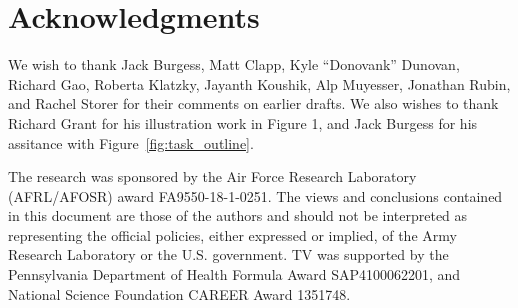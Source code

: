 \section*{Acknowledgments}
We wish to thank Jack Burgess, Matt Clapp, Kyle ``Donovank'' Dunovan, Richard Gao, Roberta Klatzky, Jayanth Koushik, Alp Muyesser, Jonathan Rubin, and Rachel Storer for their comments on earlier drafts. We also wishes to thank Richard Grant for his illustration work in Figure 1, and Jack Burgess for his assitance with Figure~\ref{fig:task_outline}.

The research was sponsored by the Air Force Research Laboratory (AFRL/AFOSR) award FA9550-18-1-0251. The views and conclusions contained in this document are those of the authors and should not be interpreted as representing the official policies, either expressed or implied, of the Army Research Laboratory or the U.S. government. TV was supported by the Pennsylvania Department of Health Formula Award SAP4100062201, and National Science Foundation CAREER Award 1351748.

